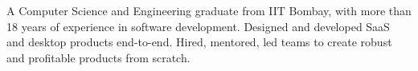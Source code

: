 

\begin{cvparagraph}

A Computer Science and Engineering graduate from IIT Bombay, with more than 18 years of experience in software development. Designed and developed SaaS and desktop products end-to-end. Hired, mentored, led teams to create robust and profitable products from scratch.
\end{cvparagraph}
